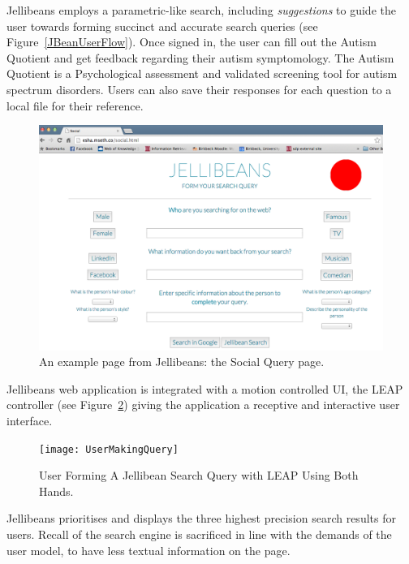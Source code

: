 \documentclass[a4paper, 11pt]{article}
\begin{document}
Jellibeans employs a parametric-like search, including \textit{suggestions} to guide the user towards forming succinct and accurate search queries (see Figure~\ref{JBeanUserFlow}). Once signed in, the user can fill out the Autism Quotient and get feedback regarding their autism symptomology. The Autism Quotient \cite{Baron Cohen et al} is a Psychological assessment and validated screening tool for autism spectrum disorders. Users can also save their responses for each question to a local file for their reference.

\begin{figure}[H]
\begin{center}
\includegraphics[scale=0.25]{SocialPage}
\end{center}
\caption{An example page from Jellibeans: the Social Query page.}
\label{SocialPage}
\end{figure}


Jellibeans web application is integrated with a motion controlled UI, the LEAP controller (see Figure~\ref{UserMakingQuery}) giving the application a receptive and interactive user interface.

\begin{figure}[H]
\begin{center}
\texttt{[image: UserMakingQuery]}
\caption{User Forming A Jellibean Search Query with LEAP Using Both Hands.}
\label{UserMakingQuery}
\end{center}
\end{figure}

Jellibeans prioritises and displays the three highest precision search results for users. Recall of the search engine is sacrificed in line with the demands of the user model, to have less textual information on the page.
\end{document}
